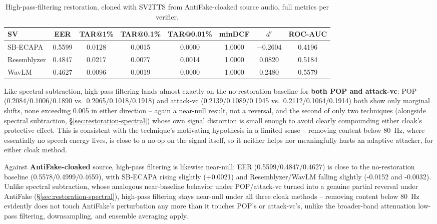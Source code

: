 \documentclass[11pt]{article}
\begin{document}
\begin{table}[H]
\centering
\caption{High-pass-filtering restoration, cloned with SV2TTS from
AntiFake-cloaked source audio, full metrics per verifier.}
\label{tab:restoration-highpass-antifake-results}
\begin{tabular}{lccccccc}
\toprule
SV & EER & TAR@1\% & TAR@0.1\% & TAR@0.01\% & minDCF & $d'$ & ROC-AUC \\
\midrule
SB-ECAPA    & 0.5599 & 0.0128 & 0.0015 & 0.0000 & 1.0000 & $-$0.2604 & 0.4196 \\
Resemblyzer & 0.4847 & 0.0217 & 0.0077 & 0.0014 & 1.0000 & 0.0820 & 0.5184 \\
WavLM       & 0.4627 & 0.0096 & 0.0019 & 0.0000 & 1.0000 & 0.2480 & 0.5579 \\
\bottomrule
\end{tabular}
\end{table}

Like spectral subtraction, high-pass filtering lands almost exactly on
the no-restoration baseline for \textbf{both POP and attack-vc}:
POP (0.2084/0.1006/0.1890 vs.\ 0.2065/0.1018/0.1918) and attack-vc
(0.2139/0.1089/0.1945 vs.\ 0.2112/0.1064/0.1914) both show only
marginal shifts, none exceeding 0.005 in either direction -- again a
near-null result, not a reversal, and the second of only two techniques
(alongside spectral subtraction, \S\ref{sec:restoration-spectral})
whose own signal distortion is small enough to avoid clearly compounding
either cloak's protective effect. This is consistent with the
technique's motivating hypothesis in a limited sense -- removing
content below 80~Hz, where essentially no speech energy lives, is close
to a no-op on the signal itself, so it neither helps nor meaningfully
hurts an adaptive attacker, for either cloak method.

Against \textbf{AntiFake-cloaked} source, high-pass filtering is
likewise near-null: EER (0.5599/0.4847/0.4627) is close to the
no-restoration baseline (0.5578/0.4999/0.4659), with SB-ECAPA rising
slightly (+0.0021) and Resemblyzer/WavLM falling slightly (-0.0152 and
-0.0032). Unlike spectral subtraction, whose analogous near-baseline
behavior under POP/attack-vc turned into a genuine partial reversal
under AntiFake (\S\ref{sec:restoration-spectral}), high-pass filtering
stays near-null under all three cloak methods -- removing content below
80~Hz evidently does not touch AntiFake's perturbation any more than it
touches POP's or attack-vc's, unlike the broader-band attenuation
low-pass filtering, downsampling, and ensemble averaging apply.
\end{document}
